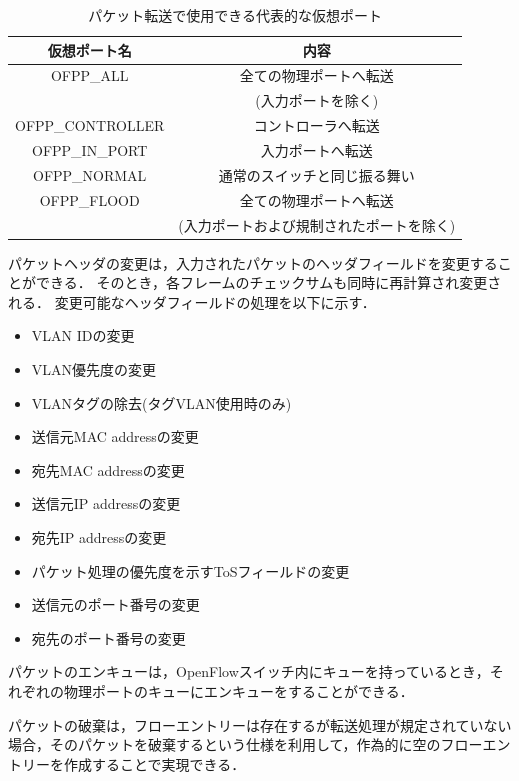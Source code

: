 
\begin{table}[tb]
	\begin{center}
		\caption{パケット転送で使用できる代表的な仮想ポート}
		\begin{tabular}{c|c}
			\hline \hline
			仮想ポート名 & 内容　\\ \hline
			OFPP\_ALL & 全ての物理ポートへ転送　\\
			　& (入力ポートを除く)　\\
			OFPP\_CONTROLLER & コントローラへ転送 \\
			OFPP\_IN\_PORT & 入力ポートへ転送　\\
			OFPP\_NORMAL & 通常のスイッチと同じ振る舞い　\\
			OFPP\_FLOOD & 全ての物理ポートへ転送　\\
			 & (入力ポートおよび規制されたポートを除く) \\ \hline
		\end{tabular}
		\label{tab:2-2}
	\end{center}
\end{table}

パケットヘッダの変更は，入力されたパケットのヘッダフィールドを変更することができる．
そのとき，各フレームのチェックサムも同時に再計算され変更される．
変更可能なヘッダフィールドの処理を以下に示す．

\begin{itemize}
	\item VLAN IDの変更
	\item VLAN優先度の変更
	\item VLANタグの除去(タグVLAN使用時のみ)
	\item 送信元MAC addressの変更
	\item 宛先MAC addressの変更
	\item 送信元IP addressの変更
	\item 宛先IP addressの変更
	\item パケット処理の優先度を示すToSフィールドの変更
	\item 送信元のポート番号の変更
	\item 宛先のポート番号の変更
\end{itemize}

パケットのエンキューは，OpenFlowスイッチ内にキューを持っているとき，それぞれの物理ポートのキューにエンキューをすることができる．

パケットの破棄は，フローエントリーは存在するが転送処理が規定されていない場合，そのパケットを破棄するという仕様を利用して，作為的に空のフローエントリーを作成することで実現できる．

